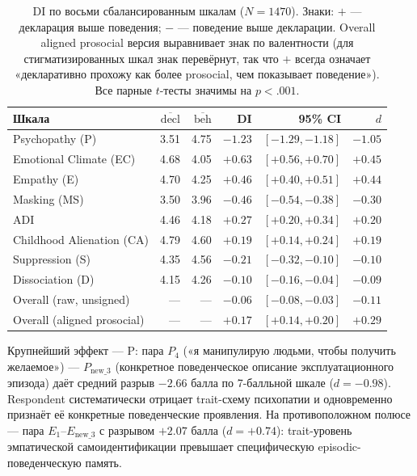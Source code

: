 \begin{table}[H]
\centering
\begin{tabular}{l r r r r r}
\toprule
Шкала & $\overline{\text{decl}}$ & $\overline{\text{beh}}$ & DI & 95\% CI & $d$ \\
\midrule
Psychopathy (P) & 3.51 & 4.75 & $-1.23$ & $[-1.29, -1.18]$ & $-1.05$ \\
Emotional Climate (EC) & 4.68 & 4.05 & $+0.63$ & $[+0.56, +0.70]$ & $+0.45$ \\
Empathy (E) & 4.70 & 4.25 & $+0.46$ & $[+0.40, +0.51]$ & $+0.44$ \\
Masking (MS) & 3.50 & 3.96 & $-0.46$ & $[-0.54, -0.38]$ & $-0.30$ \\
ADI & 4.46 & 4.18 & $+0.27$ & $[+0.20, +0.34]$ & $+0.20$ \\
Childhood Alienation (CA) & 4.79 & 4.60 & $+0.19$ & $[+0.14, +0.24]$ & $+0.19$ \\
Suppression (S) & 4.35 & 4.56 & $-0.21$ & $[-0.32, -0.10]$ & $-0.10$ \\
Dissociation (D) & 4.15 & 4.26 & $-0.10$ & $[-0.16, -0.04]$ & $-0.09$ \\
\midrule
Overall (raw, unsigned) & --- & --- & $-0.06$ & $[-0.08, -0.03]$ & $-0.11$ \\
Overall (aligned prosocial) & --- & --- & $+0.17$ & $[+0.14, +0.20]$ & $+0.29$ \\
\bottomrule
\end{tabular}
\caption{DI по восьми сбалансированным шкалам ($N{=}1470$). Знаки: $+$ --- декларация выше поведения; $-$ --- поведение выше декларации. Overall aligned prosocial версия выравнивает знак по валентности (для стигматизированных шкал знак перевёрнут, так что $+$ всегда означает «декларативно прохожу как более prosocial, чем показывает поведение»). Все парные $t$-тесты значимы на $p < .001$.}
\label{tab:di_per_scale}
\end{table}

Крупнейший эффект --- P: пара $P_4$ («я манипулирую людьми, чтобы получить желаемое») --- $P_{\text{new\_3}}$ (конкретное поведенческое описание эксплуатационного эпизода) даёт средний разрыв $-2.66$ балла по 7-балльной шкале ($d{=}{-}0.98$). Respondent систематически отрицает trait-схему психопатии и одновременно признаёт её конкретные поведенческие проявления. На противоположном полюсе --- пара $E_1$--$E_{\text{new\_3}}$ с разрывом $+2.07$ балла ($d{=}{+}0.74$): trait-уровень эмпатической самоидентификации превышает специфическую episodic-поведенческую память.


